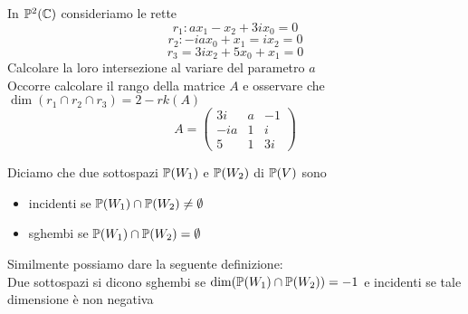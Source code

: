 \spazio
\begin{ex}In $\mathbb{P}^2(\mathbb{C})$ consideriamo le rette
$$ r_1: ax_1 -x_2 +3i x_0=0$$
$$r_2: -iax_0 +x_1 =ix_2=0$$
$$ r_3 =3ix_2 + 5x_0+x_1 =0$$
Calcolare la loro intersezione al variare del parametro $a$\\
Occorre calcolare il rango della matrice $A$ e osservare che $\dim( r_1 \cap r_2 \cap r_3) = 2 -rk(A)$
$$A=\begin{pmatrix} 
3i & a & -1 \\
-ia & 1 & i \\
5 & 1 & 3i 
\end{pmatrix}$$
\end{ex}
\spazio
\begin{defn}Diciamo che due sottospazi $\mathbb{P}(W_1)$ e $\mathbb{P}(W_2)$ di $\mathbb{P}(V)$ sono
\begin{itemize}
\item incidenti se $\mathbb{P}(W_1) \cap \mathbb{P}(W_2) \neq \emptyset$
\item sghembi se $\mathbb{P}(W_1) \cap \mathbb{P}(W_2) = \emptyset$
\end{itemize}
\begin{oss}Similmente possiamo dare la seguente definizione:\\
Due sottospazi si dicono sghembi se $\dim(\mathbb{P}(W_1) \cap \mathbb{P}(W_2))=-1$ e incidenti se tale dimensione \`e non negativa
\end{oss}
\end{defn}
